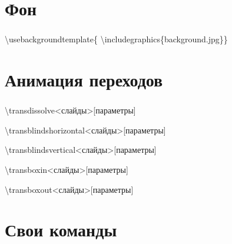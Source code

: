 \documentclass[russian, 14pt]{beamer}
\newcommand{\cm}[1]{{\color{Mycolor3}\textbackslash#1}}
\begin{document}

\section{Фон}

\begin{frame}
	\frametitle{\insertsection}
	\begin{block}{}
		\cm{usebackgroundtemplate}\{
		\cm{includegraphics}\{background.jpg\}\}
	\end{block}
\end{frame}

\usebackgroundtemplate{}

\section{Анимация переходов}

\begin{frame}
	\frametitle{\insertsection}
	\begin{block}{}
		\cm{transdissolve}<слайды>[параметры]
		
		
		\cm{transblindshorizontal}<слайды>[параметры]
		
		
		\cm{transblindsvertical}<слайды>[параметры]
		
		
		\cm{transboxin}<слайды>[параметры]
		
		
		\cm{transboxout}<слайды>[параметры]
	\end{block}
\end{frame}

\section{Свои команды}
\end{document}
